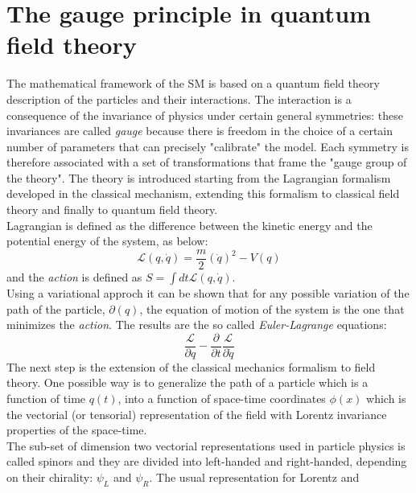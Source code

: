 \section{The gauge principle in quantum field theory}

The mathematical framework of the SM is based on a quantum field theory description of the particles and their interactions.
The interaction is a consequence of the invariance of physics under certain general symmetries:
these invariances are called \textit{gauge} because there is freedom in the choice of a certain number of parameters
that can precisely "calibrate" the model.
Each symmetry is therefore associated with a set of transformations that frame the "gauge group of the theory".
The theory is introduced starting from the Lagrangian formalism developed in the classical mechanism, extending this formalism to
classical field theory and finally to quantum field theory.
\vspace{\baselineskip}
 \\Lagrangian is defined as the difference between the kinetic energy and the potential energy of the system, as below:
\begin{equation}
\mathcal{L} (q,\dot{q}) =  \frac{m}{2}(\dot{q})^2-V(q)
\end{equation}
and the \textit{action} is defined as $ S = \int dt \mathcal{L} (q,\dot{q}) $.
\vspace{\baselineskip}
\\Using a variational approch it can be shown that for any possible variation of the path of the particle, $\partial(q)$,
the equation of motion of the system is  the one that minimizes the \textit{action}.
The results are the so called \textit{Euler-Lagrange} equations:
\begin{equation}
	\frac{\mathcal{L}}{\partial q} -  \frac{\partial}{\partial t}\frac{\mathcal{L}}{\partial\dot{q}}
\end{equation}
The next step is the extension of the classical mechanics formalism  to field theory. One possible way is to generalize 
the path of a particle which is a function of time $q(t)$, into a function of space-time coordinates $\phi(x)$ which is the
vectorial (or tensorial) representation of the field with Lorentz invariance properties of the space-time.\\
The sub-set of dimension two vectorial representations used in particle physics is called spinors and they are divided into
left-handed and right-handed, depending on their chirality: $\psi_{L}$ and $\psi_{R}$. The usual representation for Lorentz and 
